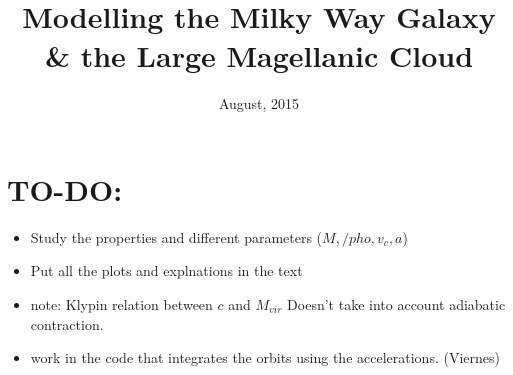 \documentclass[a4paper, 12pt]{article} %
\title{\textbf{Modelling the Milky Way Galaxy \& the Large Magellanic Cloud}} %
\date{August, 2015} %
\begin{document}












\section{TO-DO:}

\begin{itemize}

\item Study the properties and different parameters ($M, /pho, v_c, a$)
\item Put all the plots and explnations in the text
\item note: Klypin relation between $c$ and $M_{vir}$ Doesn't take into 
account adiabatic contraction. 

\item work in the code that integrates the orbits using the accelerations. (Viernes)

\end{itemize}



\end{document}
